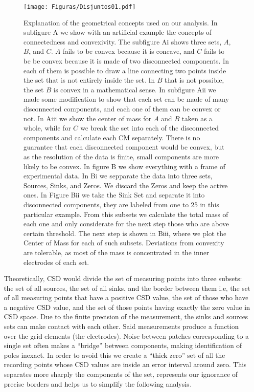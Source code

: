 \documentclass[12pt]{article}
\begin{document}
\begin{figure}
  \texttt{[image: Figuras/Disjuntos01.pdf]}
  \caption{ Explanation of the geometrical concepts used on our analysis.
    In subfigure A we show
    with an artificial example the concepts of connectedness and convexivity.
    The subfigure Ai shows
    three sets, $A$, $B$, and $C$. $A$ fails to be convex because it is concave,
    and $C$ fails to be
    be convex because it is made of two disconnected components.
    In each of them is possible to draw a line
    connecting two points inside the set that is not entirely inside the set.
    In $B$ that is not possible, the set $B$ is convex in a mathematical sense.
    In subfigure Aii we made some modification to show that
    each set can be made of many disconnected components,
    and each one of them can be convex or not.  In Aiii we show the center of
    mass for $A$ and $B$
    taken as a whole, while for $C$ we break the set into each of the disconnected
    components and calculate each CM separately. There is no guarantee that each
    disconnected component would be convex, but as the resolution of the data is finite,
    small components are more likely to
    be convex. In figure B we show everything with a frame of experimental data.
    In Bi we sepparate the
    data into three sets, Sources, Sinks, and Zeros.
    We discard the Zeros and keep the active ones.
    In Figure Bii we take the Sink Set and separate it into disconnected components,
    they are labeled from one to 25 in this particular example.
    From this subsets we calculate the total mass of each one and only
    considerate for the next step those who are above certain threshold. The
    next step is shown in Biii, where we plot the Center of Mass for each of
    such subsets. Deviations
    from convexity are tolerable,
    as most of the mass is concentrated in the inner electrodes
    of each set.
  }
  \label{disconnectedsets}
\end{figure}



Theoretically, CSD would divide the set of measuring points into three subsets: the set of all sources, the set of all sinks, and the border between them i.e, the set of all measuring points that have a positive CSD  value, the set of those who have a negative CSD value, and the set of those points having exactly the zero value in CSD space.
Due to the finite precision of the measurement,
the sinks and sources sets can make contact with each other.
Said measurements produce a function over the grid elements (the electrodes).
Noise between patches corresponding to a single set often makes a ``bridge''
between components, making identification of poles inexact.
In order to avoid this we create a ``thick zero'' set of all the recording
points whose CSD values are inside an error interval around zero.
This separates more sharply the components of the set,
represents our ignorance of precise borders and helps
us to simplify the following analysis.
\end{document}
